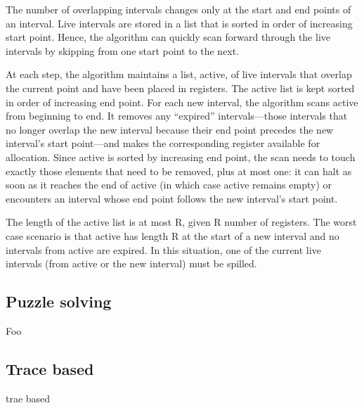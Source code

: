 \documentclass[a4paper, 10pt, conference ]{llncs}
\let\cite\parencite
\begin{document}
The number of overlapping intervals changes only at the start and end points of an interval. Live intervals are stored in a list that is sorted in order of increasing start point. Hence, the algorithm can quickly scan forward through the live intervals by skipping from one start point to the next.

At each step, the algorithm maintains a list, active, of live intervals that overlap the current point and have been placed in registers. The active list is kept sorted in order of increasing end point. For each new interval, the algorithm scans active from beginning to end. It removes any “expired” intervals—those intervals that no longer overlap the new interval because their end point precedes the new interval’s start point—and makes the corresponding register available for allocation. Since active is sorted by increasing end point, the scan needs to touch exactly those elements that need to be removed, plus at most one: it can halt as soon as it reaches the end of active (in which case active remains empty) or encounters an
interval whose end point follows the new interval’s start point.

The length of the active list is at most R, given R number of registers. The worst case scenario is that active has length R at the start of a new interval and no intervals from active are expired.  In this situation, one of the current live intervals (from active or the new interval) must be spilled.\cite{poletto1999linear}

\subsection{Puzzle solving}

Foo\cite{quintao2008register}

\subsection{Trace based}

trae based\cite{eisl2016trace}



\printbibliography
\end{document}
